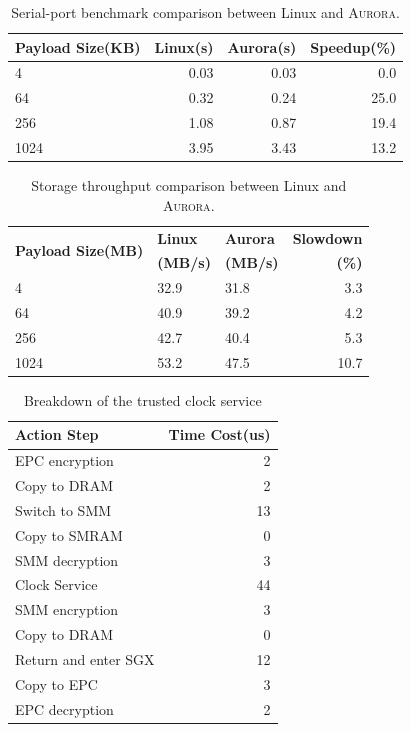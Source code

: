 \documentclass[journal,twocolumn,letterpaper,10pt]{IEEEtran}
\begin{document}
\begin{table}[t]
	\centering
	\caption{Serial-port benchmark comparison between Linux and \textsc{Aurora}.}
	\label{table:serial}
	\small
	\begin{tabular}{lrrr}
		\toprule
		\textbf{Payload Size(KB)} & \textbf{Linux(s)} & \textbf{Aurora(s)} & \textbf{Speedup(\%)} \\
		\midrule
		4 & 0.03 & 0.03 & 0.0 \\
		64 & 0.32 & 0.24 & 25.0 \\
		256 & 1.08 & 0.87 & 19.4 \\
		1024 & 3.95 & 3.43 & 13.2 \\
		\bottomrule
	\end{tabular}
\end{table}

\begin{table}[t]	
	\centering
	\caption{Storage throughput comparison between Linux and \textsc{Aurora}.}
	\label{table:dd}
	\small
	\begin{tabular}{lllr}
		\toprule
		\multirow{2}{*}{\textbf{Payload Size(MB)}} & \textbf{Linux} & \textbf{Aurora} & \textbf{Slowdown} \\ 
		& \textbf{(MB/s)} & \textbf{(MB/s)} & \textbf{(\%)} \\
		\midrule
		4 & 32.9 & 31.8 & 3.3 \\
		64 & 40.9 & 39.2 & 4.2 \\
		256 & 42.7 & 40.4 & 5.3 \\
		1024 & 53.2 & 47.5 & 10.7 \\
		\bottomrule
	\end{tabular}
\end{table}

\iftrue

\begin{table}
	\centering
	\caption{ Breakdown of the trusted clock service}
	\small
	\label{table:breaktime}
	\begin{tabular}{lr}
		\toprule
		\textbf{Action Step} & \textbf{Time Cost(us)} \\
		\midrule
		EPC encryption & 2\\
		Copy to DRAM & 2\\
		Switch to SMM & 13\\
		Copy to SMRAM & 0\\
		SMM decryption & 3\\
		Clock Service & 44\\
		SMM encryption & 3\\
		Copy to DRAM & 0\\
		Return and enter SGX & 12\\
		Copy to EPC & 3\\
		EPC decryption & 2\\
		\bottomrule
	\end{tabular}
\end{table}
\end{document}
